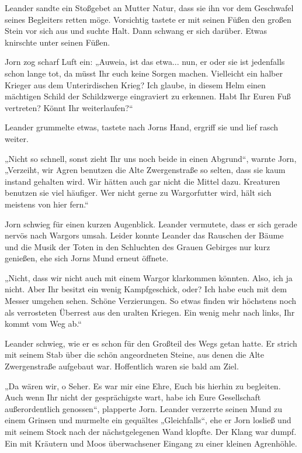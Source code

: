 Leander sandte ein Stoßgebet an Mutter Natur, dass sie ihn vor dem Geschwafel seines Begleiters retten möge. Vorsichtig tastete er mit seinen Füßen den großen Stein vor sich aus und suchte Halt. Dann schwang er sich darüber. Etwas knirschte unter seinen Füßen.

Jorn zog scharf Luft ein: „Auweia, ist das etwa... nun, er oder sie ist jedenfalls schon lange tot, da müsst Ihr euch keine Sorgen machen. Vielleicht ein halber Krieger aus dem Unterirdischen Krieg? Ich glaube, in diesem Helm einen mächtigen Schild der Schildzwerge eingraviert zu erkennen. Habt Ihr Euren Fuß vertreten? Könnt Ihr weiterlaufen?“

Leander grummelte etwas, tastete nach Jorns Hand, ergriff sie und lief rasch weiter.

„Nicht so schnell, sonst zieht Ihr uns noch beide in einen Abgrund“, warnte Jorn, „Verzeiht, wir Agren benutzen die Alte Zwergenstraße so selten, dass sie kaum instand gehalten wird. Wir hätten auch gar nicht die Mittel dazu. Kreaturen benutzen sie viel häufiger. Wer nicht gerne zu Wargorfutter wird, hält sich meistens von hier fern.“

Jorn schwieg für einen kurzen Augenblick. Leander vermutete, dass er sich gerade nervös nach Wargors umsah. Leider konnte Leander das Rauschen der Bäume und die Musik der Toten in den Schluchten des Grauen Gebirges nur kurz genießen, ehe sich Jorns Mund erneut öffnete.

„Nicht, dass wir nicht auch mit einem Wargor klarkommen könnten. Also, ich ja nicht. Aber Ihr besitzt ein wenig Kampfgeschick, oder? Ich habe euch mit dem Messer umgehen sehen. Schöne Verzierungen. So etwas finden wir höchstens noch als verrosteten Überrest aus den uralten Kriegen. Ein wenig mehr nach links, Ihr kommt vom Weg ab.“

Leander schwieg, wie er es schon für den Großteil des Wegs getan hatte. Er strich mit seinem Stab über die schön angeordneten Steine, aus denen die Alte Zwergenstraße aufgebaut war. Hoffentlich waren sie bald am Ziel.\bigskip







„Da wären wir, o Seher. Es war mir eine Ehre, Euch bis hierhin zu begleiten. Auch wenn Ihr nicht der gesprächigste wart, habe ich Eure Gesellschaft außerordentlich genossen“, plapperte Jorn. Leander verzerrte seinen Mund zu einem Grinsen und murmelte ein gequältes „Gleichfalls“, ehe er Jorn losließ und mit seinem Stock nach der nächstgelegenen Wand klopfte. Der Klang war dumpf. Ein mit Kräutern und Moos überwachsener Eingang zu einer kleinen Agrenhöhle.

